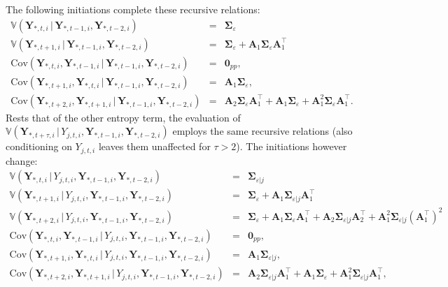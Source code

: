 The following initiations complete these recursive relations:
\begin{eqnarray*}
\mathbb{V}(\mathbf{Y}_{\ast, t, i} \, | \, \mathbf{Y}_{\ast, t -1, i}, \mathbf{Y}_{\ast, t -2, i}) & = & \mathbf{\Sigma}_{\varepsilon}
\\
\mathbb{V}(\mathbf{Y}_{\ast, t + 1, i} \, | \, \mathbf{Y}_{\ast, t -1, i}, \mathbf{Y}_{\ast, t -2, i}) &  = &  \mathbf{\Sigma}_{\varepsilon} + \mathbf{A}_1 \mathbf{\Sigma}_{\varepsilon} \mathbf{A}_1^{\top}
\\
\mbox{Cov}(\mathbf{Y}_{\ast, t, i}, \mathbf{Y}_{\ast, t -1, i} \, | \, \mathbf{Y}_{\ast, t -1, i}, \mathbf{Y}_{\ast, t -2, i}) & = & \mathbf{0}_{pp},
\\
\mbox{Cov}(\mathbf{Y}_{\ast, t+1, i}, \mathbf{Y}_{\ast, t, i} \, | \, \mathbf{Y}_{\ast, t -1, i}, \mathbf{Y}_{\ast, t -2, i}) & = & \mathbf{A}_1 \mathbf{\Sigma}_{\varepsilon},
\\
\mbox{Cov}(\mathbf{Y}_{\ast, t+2, i}, \mathbf{Y}_{\ast, t +1, i} \, | \, \mathbf{Y}_{\ast, t -1, i}, \mathbf{Y}_{\ast, t -2, i}) & = & \mathbf{A}_2 \mathbf{\Sigma}_{\varepsilon} \mathbf{A}_1^{\top} + \mathbf{A}_1 \mathbf{\Sigma}_{\varepsilon} + \mathbf{A}_1^2 \mathbf{\Sigma}_{\varepsilon} \mathbf{A}_1^{\top}.
\end{eqnarray*}
Rests that of the other entropy term, the evaluation of
$\mathbb{V}(\mathbf{Y}_{\ast,t+\tau, i} \, | \, Y_{j,t,i}, \mathbf{Y}_{\ast,t-1,i}, \mathbf{Y}_{\ast,t-2,i})$ employs the same recursive relations (also conditioning on $Y_{j,t,i}$ leaves them unaffected for $\tau > 2$). The initiations however change:
\begin{eqnarray*}
\mathbb{V}(\mathbf{Y}_{\ast, t, i} \, | \,  Y_{j,t,i}, \mathbf{Y}_{\ast, t -1, i}, \mathbf{Y}_{\ast, t -2, i}) & = & \mathbf{\Sigma}_{\varepsilon | j}
\\
\mathbb{V}(\mathbf{Y}_{\ast, t + 1, i} \, | \,  Y_{j,t,i}, \mathbf{Y}_{\ast, t -1, i}, \mathbf{Y}_{\ast, t -2, i}) &  = &  \mathbf{\Sigma}_{\varepsilon} + \mathbf{A}_1 \mathbf{\Sigma}_{\varepsilon |j } \mathbf{A}_1^{\top}
\\
\mathbb{V}(\mathbf{Y}_{\ast, t + 2, i} \, | \,  Y_{j,t,i}, \mathbf{Y}_{\ast, t -1, i}, \mathbf{Y}_{\ast, t -2, i}) &  = &  \mathbf{\Sigma}_{\varepsilon} + \mathbf{A}_1 \mathbf{\Sigma}_{\varepsilon } \mathbf{A}_1^{\top} + \mathbf{A}_2 \mathbf{\Sigma}_{\varepsilon |j } \mathbf{A}_2^{\top} + \mathbf{A}_1^2 \mathbf{\Sigma}_{\varepsilon |j } (\mathbf{A}_1^{\top})^2
\\
\mbox{Cov}(\mathbf{Y}_{\ast, t, i}, \mathbf{Y}_{\ast, t -1, i} \, | \,  Y_{j,t,i}, \mathbf{Y}_{\ast, t -1, i}, \mathbf{Y}_{\ast, t -2, i}) & = & \mathbf{0}_{pp},
\\
\mbox{Cov}(\mathbf{Y}_{\ast, t+1, i}, \mathbf{Y}_{\ast, t, i} \, | \,  Y_{j,t,i}, \mathbf{Y}_{\ast, t -1, i}, \mathbf{Y}_{\ast, t -2, i}) & = & \mathbf{A}_1 \mathbf{\Sigma}_{\varepsilon | j},
\\
\mbox{Cov}(\mathbf{Y}_{\ast, t+2, i}, \mathbf{Y}_{\ast, t +1, i} \, | \,  Y_{j,t,i}, \mathbf{Y}_{\ast, t -1, i}, \mathbf{Y}_{\ast, t -2, i}) & = & \mathbf{A}_2 \mathbf{\Sigma}_{\varepsilon | j} \mathbf{A}_1^{\top}
+ \mathbf{A}_1 \mathbf{\Sigma}_{\varepsilon} + \mathbf{A}_1^2 \mathbf{\Sigma}_{\varepsilon |j } \mathbf{A}_1^{\top},
\end{eqnarray*}
